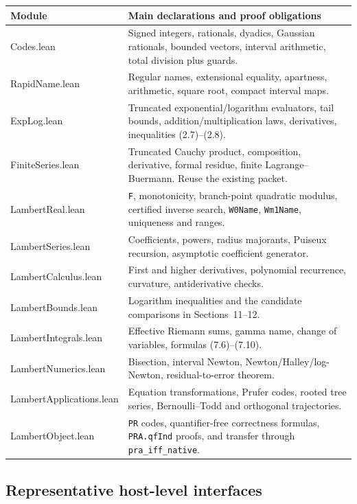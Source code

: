 \documentclass[11pt]{article}
\theoremstyle{definition}
\newcommand{\code}[1]{\nolinkurl{#1}}
\begin{document}
\begin{longtable}{>{\ttfamily}p{} p{}}
\toprule
Module & Main declarations and proof obligations\\
\midrule
\endhead
Codes.lean & Signed integers, rationals, dyadics, Gaussian rationals, bounded
vectors, interval arithmetic, total division plus guards.\\
RapidName.lean & Regular names, extensional equality, apartness, arithmetic,
square root, compact interval maps.\\
ExpLog.lean & Truncated exponential/logarithm evaluators, tail bounds,
addition/multiplication laws, derivatives, inequalities (2.7)--(2.8).\\
FiniteSeries.lean & Truncated Cauchy product, composition, derivative, formal
residue, finite Lagrange--Buermann.  Reuse the existing packet.\\
LambertReal.lean & \code{F}, monotonicity, branch-point quadratic modulus,
certified inverse search, \code{W0Name}, \code{Wm1Name}, uniqueness and ranges.\\
LambertSeries.lean & Coefficients, powers, radius majorants, Puiseux recursion,
asymptotic coefficient generator.\\
LambertCalculus.lean & First and higher derivatives, polynomial recurrence,
curvature, antiderivative checks.\\
LambertBounds.lean & Logarithm inequalities and the candidate comparisons in
Sections~11--12.\\
LambertIntegrals.lean & Effective Riemann sums, gamma name, change of variables,
formulas (7.6)--(7.10).\\
LambertNumerics.lean & Bisection, interval Newton, Newton/Halley/log-Newton,
residual-to-error theorem.\\
LambertApplications.lean & Equation transformations, Prufer codes, rooted tree
series, Bernoulli--Todd and orthogonal trajectories.\\
LambertObject.lean & \code{PR} codes, quantifier-free correctness formulas,
\code{PRA.qfInd} proofs, and transfer through \code{pra_iff_native}.\\
\bottomrule
\end{longtable}

\subsection{Representative host-level interfaces}
\end{document}
